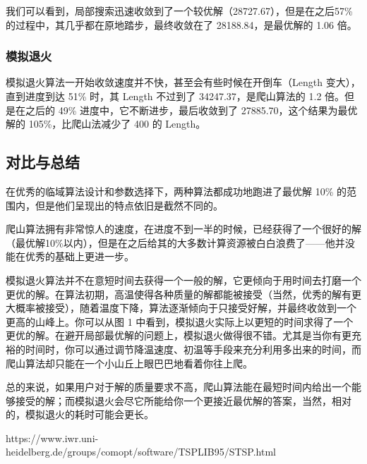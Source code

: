 \documentclass[12pt]{article}%
\begin{document}
我们可以看到，局部搜索迅速收敛到了一个较优解（28727.67），但是在之后57\%的过程中，其几乎都在原地踏步，最终收敛在了 28188.84，是最优解的 1.06 倍。

\subsubsection{模拟退火}

模拟退火算法一开始收敛速度并不快，甚至会有些时候在开倒车（Length 变大），直到进度到达 51\% 时，其 Length 不过到了 34247.37，是爬山算法的 1.2 倍。但是在之后的 49\% 进度中，它不断进步，最后收敛到了 27885.70，这个结果为最优解的 105\%，比爬山法减少了 400 的 Length。

\subsection{对比与总结}

在优秀的临域算法设计和参数选择下，两种算法都成功地跑进了最优解 10\% 的范围内，但是他们呈现出的特点依旧是截然不同的。

爬山算法拥有非常惊人的速度，在进度不到一半的时候，已经获得了一个很好的解（最优解10\%以内），但是在之后给其的大多数计算资源被白白浪费了——他并没能在优秀的基础上更进一步。

模拟退火算法并不在意短时间去获得一个一般的解，它更倾向于用时间去打磨一个更优的解。在算法初期，高温使得各种质量的解都能被接受（当然，优秀的解有更大概率被接受），随着温度下降，算法逐渐倾向于只接受好解，并最终收敛到一个更高的山峰上。你可以从图 1 中看到，模拟退火实际上以更短的时间求得了一个更优的解。在避开局部最优解的问题上，模拟退火做得很不错。尤其是当你有更充裕的时间时，你可以通过调节降温速度、初温等手段来充分利用多出来的时间，而爬山算法却只能在一个小山丘上眼巴巴地看着你往上爬。

总的来说，如果用户对于解的质量要求不高，爬山算法能在最短时间内给出一个能够接受的解；而模拟退火会尽它所能给你一个更接近最优解的答案，当然，相对的，模拟退火的耗时可能会更长。

\begin{thebibliography}{}
 https://www.iwr.uni-heidelberg.de/groups/comopt/software/TSPLIB95/STSP.html
\end{thebibliography}
\end{document}
